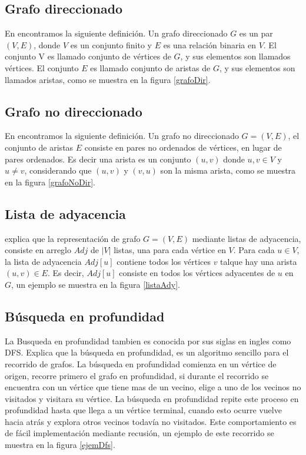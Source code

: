 \subsection{Grafo direccionado}
En \cite{Cormen2009} encontramos la siguiente definición. Un grafo direccionado $G$ es un par $(V,E)$, donde $V$ es un conjunto finito y $E$ es una relación binaria en $V$. El conjunto V es llamado conjunto de vértices de $G$, y sus elementos son llamados vértices. El conjunto $E$ es llamado conjunto de aristas de $G$, y sus elementos son llamados aristas, como se muestra en la figura \ref{grafoDir}.



\subsection{Grafo no direccionado}
En \cite{Cormen2009} encontramos la siguiente definición. Un grafo no direccionado $G=(V,E)$, el conjunto de aristas $E$ consiste en pares no ordenados de vértices, en lugar de pares ordenados. Es decir una arista es un conjunto $(u,v)$ donde $u,v \in V$ y $u \neq v$, considerando que $(u,v)$ y $(v,u)$ son la misma arista, como se muestra en la figura \ref{grafoNoDir}.



\subsection{Lista de adyacencia}
\cite{Cormen2009} explica que la representación de grafo $G=(V,E)$ mediante listas de adyacencia, consiste en arreglo $Adj$ de $|V|$ listas, una para cada vértice en $V$. Para cada $u \in V$, la lista de adyacencia $Adj[u]$ contiene todos los vértices $v$ talque hay una arista $(u,v) \in E$. Es decir, $Adj[u]$ consiste en todos los vértices adyacentes de $u$ en $G$, un ejemplo se muestra en la figura \ref{listaAdy}.



\subsection{Búsqueda en profundidad}
La Busqueda en profundidad tambien es conocida por sus siglas en ingles como DFS. \cite{Halim2019} Explica que la búsqueda en profundidad, es un algoritmo sencillo para el recorrido de grafos. La búsqueda en profundidad comienza en un vértice de origen, recorre primero el grafo en profundidad, si durante el recorrido se encuentra con un vértice que tiene mas de un vecino, elige a uno de los vecinos no visitados y visitara su vértice. La búsqueda en profundidad repite este proceso en profundidad hasta que llega a un vértice terminal, cuando esto ocurre vuelve hacia atrás y explora otros vecinos todavía no visitados. Este comportamiento es de fácil implementación mediante recusión, un ejemplo de este recorrido se muestra en la figura \ref{ejemDfs}.

